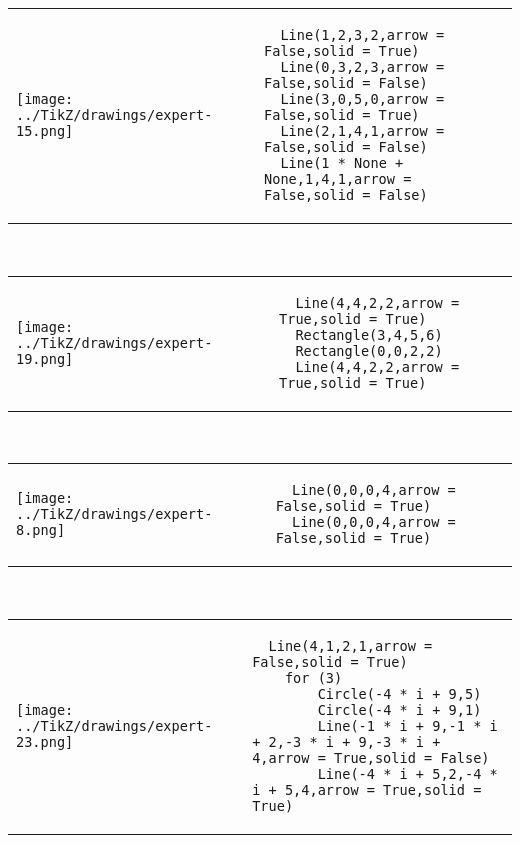         \begin{tabular}{ll}
\texttt{[image: ../TikZ/drawings/expert-15.png]}&
        \begin{minipage}{10cm}
        \begin{verbatim}
  Line(1,2,3,2,arrow = False,solid = True)
  Line(0,3,2,3,arrow = False,solid = False)
  Line(3,0,5,0,arrow = False,solid = True)
  Line(2,1,4,1,arrow = False,solid = False)
  Line(1 * None + None,1,4,1,arrow = False,solid = False)
        \end{verbatim}
\end{minipage}
\end{tabular}        
        \\

        \begin{tabular}{ll}
\texttt{[image: ../TikZ/drawings/expert-19.png]}&
        \begin{minipage}{10cm}
        \begin{verbatim}
  Line(4,4,2,2,arrow = True,solid = True)
  Rectangle(3,4,5,6)
  Rectangle(0,0,2,2)
  Line(4,4,2,2,arrow = True,solid = True)
        \end{verbatim}
\end{minipage}
\end{tabular}        
        \\

        \begin{tabular}{ll}
\texttt{[image: ../TikZ/drawings/expert-8.png]}&
        \begin{minipage}{10cm}
        \begin{verbatim}
  Line(0,0,0,4,arrow = False,solid = True)
  Line(0,0,0,4,arrow = False,solid = True)
        \end{verbatim}
\end{minipage}
\end{tabular}        
        \\

        \begin{tabular}{ll}
\texttt{[image: ../TikZ/drawings/expert-23.png]}&
        \begin{minipage}{10cm}
        \begin{verbatim}
  Line(4,1,2,1,arrow = False,solid = True)
    for (3)
        Circle(-4 * i + 9,5)
        Circle(-4 * i + 9,1)
        Line(-1 * i + 9,-1 * i + 2,-3 * i + 9,-3 * i + 4,arrow = True,solid = False)
        Line(-4 * i + 5,2,-4 * i + 5,4,arrow = True,solid = True)
        \end{verbatim}
\end{minipage}
\end{tabular}        
        \\

